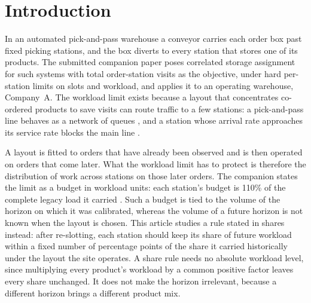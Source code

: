 \section{Introduction}\label{sec:introduction}
In an automated pick-and-pass warehouse a conveyor carries each order box past fixed picking stations, and the box diverts to every station that stores one of its products. The submitted companion paper \citep{belul_companion} poses correlated storage assignment for such systems with total order-station visits as the objective, under hard per-station limits on slots and workload, and applies it to an operating warehouse, Company~A. The workload limit exists because a layout that concentrates co-ordered products to save visits can route traffic to a few stations: a pick-and-pass line behaves as a network of queues \citep{yu2008pickandpass}, and a station whose arrival rate approaches its service rate blocks the main line \citep{kim2020}.

A layout is fitted to orders that have already been observed and is then operated on orders that come later. What the workload limit has to protect is therefore the distribution of work across stations on those later orders. The companion states the limit as a budget in workload units: each station's budget is 110\% of the complete legacy load it carried \citep{belul_companion}. Such a budget is tied to the volume of the horizon on which it was calibrated, whereas the volume of a future horizon is not known when the layout is chosen. This article studies a rule stated in shares instead: after re-slotting, each station should keep its share of future workload within a fixed number of percentage points of the share it carried historically under the layout the site operates. %
A share rule needs no absolute workload level, since multiplying every product's workload by a common positive factor leaves every share unchanged. It does not make the horizon irrelevant, because a different horizon brings a different product mix.

